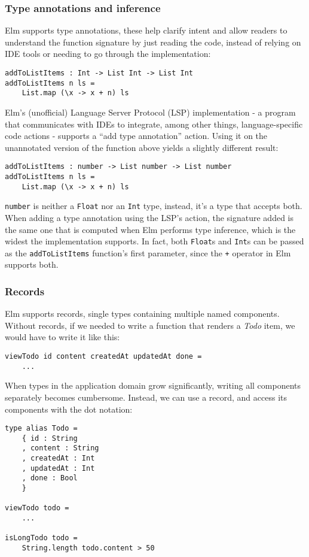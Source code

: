 \subsubsection{Type annotations and inference}
Elm supports type annotations, these help clarify intent and allow readers to understand the function signature by just reading the code, instead of relying on IDE tools or needing to go through the implementation:
\begin{verbatim}
addToListItems : Int -> List Int -> List Int
addToListItems n ls =
    List.map (\x -> x + n) ls
\end{verbatim}

Elm's (unofficial) Language Server Protocol (LSP) implementation - a program that communicates with IDEs to integrate, among other things, language-specific code actions - supports a ``add type annotation'' action. Using it on the unannotated version of the function above yields a slightly different result:
\begin{verbatim}
addToListItems : number -> List number -> List number
addToListItems n ls =
    List.map (\x -> x + n) ls
\end{verbatim}
\texttt{number} is neither a \texttt{Float} nor an \texttt{Int} type, instead, it's a type that accepts both. When adding a type annotation using the LSP's action, the signature added is the same one that is computed when Elm performs type inference, which is the widest the implementation supports. In fact, both \texttt{Float}s and \texttt{Int}s can be passed as the \texttt{addToListItems} function's first parameter, since the \texttt{+} operator in Elm supports both.

\subsubsection{Records}
Elm supports records, single types containing multiple named components. Without records, if we needed to write a function that renders a \textit{Todo} item, we would have to write it like this:
\begin{verbatim}
viewTodo id content createdAt updatedAt done =
    ...
\end{verbatim}
When types in the application domain grow significantly, writing all components separately becomes cumbersome. Instead, we can use a record, and access its components with the dot notation:
\begin{verbatim}
type alias Todo =
    { id : String
    , content : String
    , createdAt : Int
    , updatedAt : Int
    , done : Bool
    }

viewTodo todo =
    ...

isLongTodo todo =
    String.length todo.content > 50
\end{verbatim}

